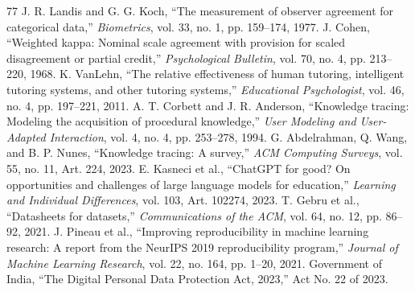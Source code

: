 \documentclass[conference]{IEEEtran}
\begin{document}
\begin{thebibliography}{77}
 J. R. Landis and G. G. Koch, ``The measurement of observer agreement for categorical data,'' \emph{Biometrics}, vol. 33, no. 1, pp. 159--174, 1977.
 J. Cohen, ``Weighted kappa: Nominal scale agreement with provision for scaled disagreement or partial credit,'' \emph{Psychological Bulletin}, vol. 70, no. 4, pp. 213--220, 1968.
 K. VanLehn, ``The relative effectiveness of human tutoring, intelligent tutoring systems, and other tutoring systems,'' \emph{Educational Psychologist}, vol. 46, no. 4, pp. 197--221, 2011.
 A. T. Corbett and J. R. Anderson, ``Knowledge tracing: Modeling the acquisition of procedural knowledge,'' \emph{User Modeling and User-Adapted Interaction}, vol. 4, no. 4, pp. 253--278, 1994.
 G. Abdelrahman, Q. Wang, and B. P. Nunes, ``Knowledge tracing: A survey,'' \emph{ACM Computing Surveys}, vol. 55, no. 11, Art. 224, 2023.
 E. Kasneci et al., ``ChatGPT for good? On opportunities and challenges of large language models for education,'' \emph{Learning and Individual Differences}, vol. 103, Art. 102274, 2023.
 T. Gebru et al., ``Datasheets for datasets,'' \emph{Communications of the ACM}, vol. 64, no. 12, pp. 86--92, 2021.
 J. Pineau et al., ``Improving reproducibility in machine learning research: A report from the NeurIPS 2019 reproducibility program,'' \emph{Journal of Machine Learning Research}, vol. 22, no. 164, pp. 1--20, 2021.
 Government of India, ``The Digital Personal Data Protection Act, 2023,'' Act No. 22 of 2023.
\end{thebibliography}
\end{document}
